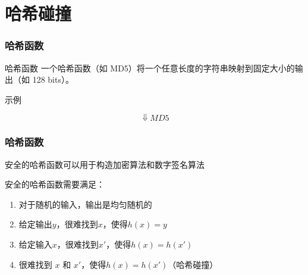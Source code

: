 \documentclass{beamer}
\begin{document}
\section{哈希碰撞}

\begin{frame}
    \frametitle{哈希函数}

    \begin{block}{哈希函数}
        一个哈希函数（如 MD5）将一个任意长度的字符串映射到固定大小的输出（如 128 bits）。
    \end{block}

    \begin{block}{示例}
        \begin{center}
        \end{center}
        \[\Downarrow MD5\]
        \begin{center}
        \end{center}
    \end{block}

\end{frame}

\begin{frame}
    \frametitle{哈希函数}

    安全的哈希函数可以用于构造加密算法和数字签名算法

    \vline

    安全的哈希函数需要满足：

    \begin{enumerate}
        \item 对于随机的输入，输出是均匀随机的
        \item 给定输出$y$，很难找到$x$，使得$h(x)=y$
        \item 给定输入$x$，很难找到$x'$，使得$h(x)=h(x')$
        \item 很难找到 $x$ 和 $x'$，使得$h(x)=h(x')$（哈希碰撞）
    \end{enumerate}

\end{frame}
\end{document}
